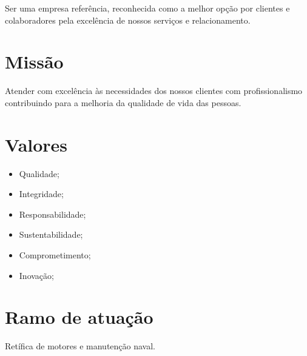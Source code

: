 Ser uma empresa referência, reconhecida como a melhor opção por clientes e colaboradores pela excelência 
de nossos serviços e relacionamento.

\section{Missão}\label{sec:missao}

Atender com excelência às necessidades dos nossos clientes com profissionalismo contribuindo 
para a melhoria da qualidade de vida das pessoas.

\section{Valores}\label{sec:valores}

\begin{itemize}
    \item Qualidade;
    \item Integridade;
    \item Responsabilidade;
    \item Sustentabilidade;
    \item Comprometimento;
    \item Inovação;
\end{itemize}

\section{Ramo de atuação}\label{sec:ramo}

Retífica de motores e manutenção naval.